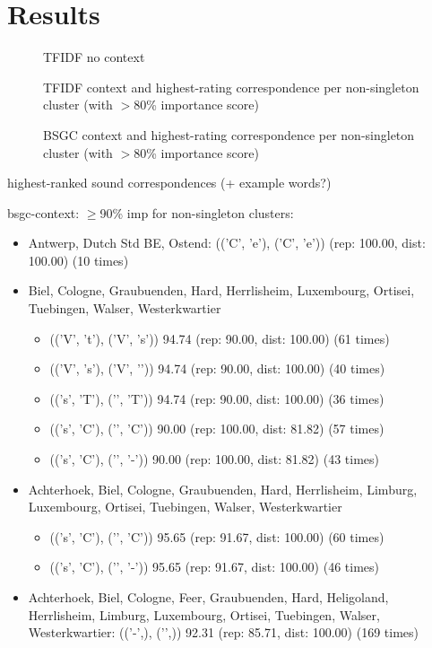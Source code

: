 \documentclass{article}
\begin{document}
\section{Results}

\begin{figure}
  
  \caption{TFIDF no context}
  \label{fig:tfidf-nocontext}
\end{figure}

\begin{figure}
  
  \caption{TFIDF context and highest-rating correspondence per non-singleton cluster (with $>$80\% importance score)}
  \label{fig:tfidf-context}
\end{figure}


\begin{figure}
  
  \caption{BSGC context and highest-rating correspondence per non-singleton cluster (with $>$80\% importance score)}
  \label{fig:bsgc-context}
\end{figure}


highest-ranked sound correspondences
(+ example words?)

bsgc-context: $\geq$90\% imp for non-singleton clusters:
\begin{itemize}
\item Antwerp, Dutch Std BE, Ostend:
(('C', 'e'), ('C', 'e\textlengthmark')) (rep: 100.00, dist: 100.00) (10 times)
\item Biel, Cologne, Graubuenden, Hard, Herrlisheim, Luxembourg, Ortisei, Tuebingen, Walser, Westerkwartier
\begin{itemize}
\item (('V', 't'), ('V', 's'))  94.74 (rep: 90.00, dist: 100.00)  (61 times)
\item (('V', 's'), ('V', '\textesh')) 94.74 (rep: 90.00, dist: 100.00)  (40 times)
\item (('s', 'T'), ('\textesh', 'T')) 94.74 (rep: 90.00, dist: 100.00)  (36 times)
\item (('s', 'C'), ('\textesh', 'C')) 90.00 (rep: 100.00, dist: 81.82)  (57 times)
\item (('s', 'C'), ('\textesh', '-')) 90.00 (rep: 100.00, dist: 81.82)  (43 times)
\end{itemize}
\item Achterhoek, Biel, Cologne, Graubuenden, Hard, Herrlisheim, Limburg, Luxembourg, Ortisei, Tuebingen, Walser, Westerkwartier
\begin{itemize}
\item (('s', 'C'), ('\textesh', 'C')) 95.65 (rep: 91.67, dist: 100.00)  (60 times)
\item (('s', 'C'), ('\textesh', '-')) 95.65 (rep: 91.67, dist: 100.00)  (46 times)
\end{itemize}
\item Achterhoek, Biel, Cologne, Feer, Graubuenden, Hard, Heligoland, Herrlisheim, Limburg, Luxembourg, Ortisei, Tuebingen, Walser, Westerkwartier: 
(('-',), ('\textglotstop',))  92.31 (rep: 85.71, dist: 100.00)  (169 times)
\end{itemize}
\end{document}
